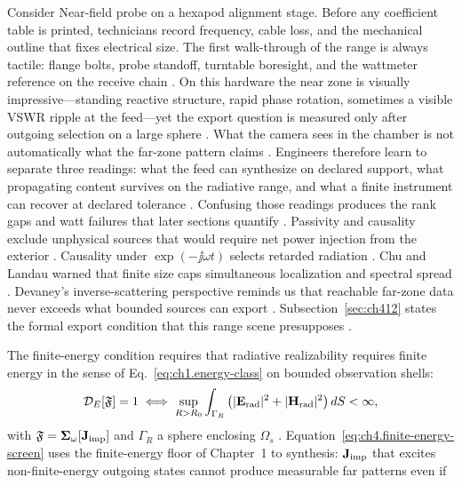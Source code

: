 \begin{physicalvignette}
Consider Near-field probe on a hexapod alignment stage. Before any coefficient table is printed, technicians record frequency, cable loss, and the mechanical outline that fixes electrical size. The first walk-through of the range is always tactile: flange bolts, probe standoff, turntable boresight, and the wattmeter reference on the receive chain \cite{hansen1988}.
On this hardware the near zone is visually impressive---standing reactive structure, rapid phase rotation, sometimes a visible VSWR ripple at the feed---yet the export question is measured only after outgoing selection on a large sphere \cite{harrington2001}. What the camera sees in the chamber is not automatically what the far-zone pattern claims \cite{stratton1941}.
Engineers therefore learn to separate three readings: what the feed can synthesize on declared support, what propagating content survives on the radiative range, and what a finite instrument can recover at declared tolerance \cite{devaney2004}. Confusing those readings produces the rank gaps and watt failures that later sections quantify \cite{pal2026}.
Passivity and causality exclude unphysical sources that would require net power injection from the exterior . Causality under $\exp(-\jj\omega t)$ selects retarded radiation \cite{jackson1999}.
Chu and Landau warned that finite size caps simultaneous localization and spectral spread \cite{chu1948}. Devaney's inverse-scattering perspective reminds us that reachable far-zone data never exceeds what bounded sources can export \cite{devaney2004}.
Subsection~\ref{sec:ch412} states the formal export condition that this range scene presupposes \cite{stratton1941}.
\end{physicalvignette}
The finite-energy condition requires that radiative realizability requires finite energy in the sense of Eq.~\eqref{eq:ch1.energy-class} on
bounded observation shells:
\begin{equation}
\label{eq:ch4.finite-energy-screen}
\mathcal{D}_{E}[\mathfrak{F}]
=
1
\iff
\sup_{R>R_{0}}
\int_{\Gamma_{R}}
\big(
|\mathbf{E}_{\mathrm{rad}}|^{2}+|\mathbf{H}_{\mathrm{rad}}|^{2}
\big)\,dS
<
\infty,
\end{equation}
with \(\mathfrak{F}=\boldsymbol{\Sigma}_\omega[\mathbf{J}_{\mathrm{imp}}]\) and \(\Gamma_{R}\) a sphere enclosing
\(\Omega_{s}\) \cite{stratton1941}. Equation~\eqref{eq:ch4.finite-energy-screen}
uses the finite-energy floor of Chapter~1 to synthesis: \(\mathbf{J}_{\mathrm{imp}}\) that excites
non-finite-energy outgoing states cannot produce measurable far patterns even if
